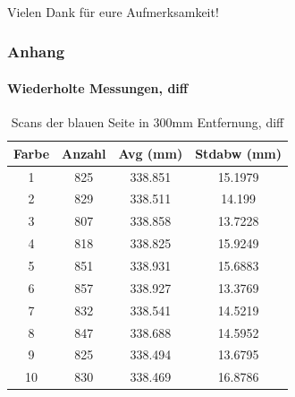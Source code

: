 \documentclass[xcolor=dvipsnames]{beamer}
\begin{document}
\begin{frame}
\begin{columns}
	\end{columns}

\end{frame}


\begin{frame}
	\frametitle{\mbox{}}
	\center \LARGE Vielen Dank für eure Aufmerksamkeit!
\end{frame}


\begin{frame}[noframenumbering]
	\frametitle{Anhang}
	\framesubtitle{Wiederholte Messungen, diff}
	\begin{table}
		\begin{tabular}{c|c|c|c}
			Farbe & Anzahl & Avg (mm) & Stdabw (mm) \\
			\hline
			1 & 825 & 338.851 & 15.1979 \\
			2 & 829 & 338.511 & 14.199 \\
			3 & 807 & 338.858 & 13.7228 \\
			4 & 818 & 338.825 & 15.9249 \\
			5 & 851 & 338.931 & 15.6883 \\
			6 & 857 & 338.927 & 13.3769 \\
			7 & 832 & 338.541 & 14.5219 \\
			8 & 847 & 338.688 & 14.5952 \\
			9 & 825 & 338.494 & 13.6795 \\
			10 & 830 & 338.469 & 16.8786 \\
		\end{tabular}
		\caption{Scans der blauen Seite in 300mm Entfernung, diff}
	\end{table}
\end{frame}
\end{document}
